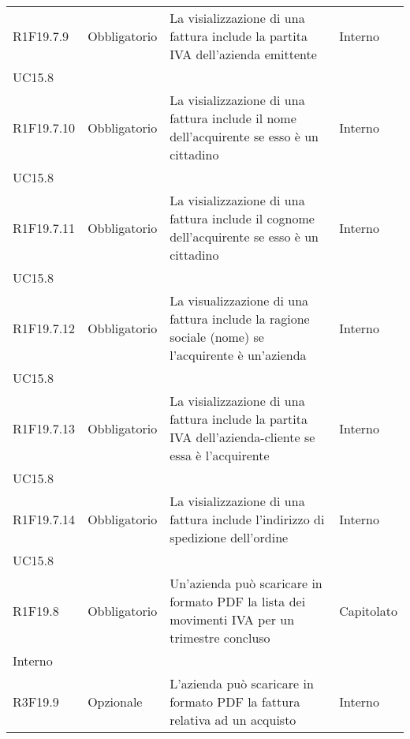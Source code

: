 \begin{longtable}{ >{\centering}p{} >{\centering}p{}
		>{\raggedright}p{} >{\centering}p{}}
	R1F19.7.9	&	Obbligatorio	&	La visializzazione di una fattura include la partita IVA dell'azienda emittente	&	Interno\\ UC15.8	\tabularnewline
	R1F19.7.10	&	Obbligatorio	&	La visializzazione di una fattura include il nome dell'acquirente se esso è un cittadino	&	Interno\\ UC15.8	\tabularnewline
	R1F19.7.11	&	Obbligatorio	&	La visializzazione di una fattura include il cognome dell'acquirente se esso è un cittadino	&	Interno\\ UC15.8	\tabularnewline
	R1F19.7.12	&	Obbligatorio	&	La visualizzazione di una fattura include la ragione sociale (nome) se l'acquirente è un'azienda 	&	Interno\\ UC15.8	\tabularnewline
	R1F19.7.13	&	Obbligatorio	&	La visializzazione di una fattura include la partita IVA dell'azienda-cliente se essa è l'acquirente	&	Interno\\ UC15.8	\tabularnewline
	R1F19.7.14	&	Obbligatorio	&	La visializzazione di una fattura include l'indirizzo di spedizione dell'ordine	&	Interno\\ UC15.8	\tabularnewline
	R1F19.8	&	Obbligatorio	&	Un'azienda può scaricare in formato PDF la lista dei movimenti IVA per un trimestre concluso	&	Capitolato\\ Interno	\tabularnewline
	R3F19.9	&	Opzionale	&	L'azienda può scaricare in formato PDF la fattura relativa ad un acquisto	&	Interno	\tabularnewline
	
	
	
\end{longtable}

